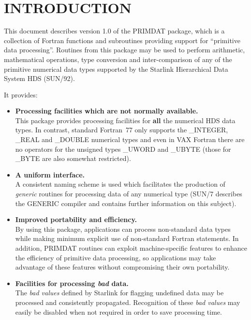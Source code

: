 \documentclass[11pt,nolof]{starlink}
\providecommand{\name}[1]{#1}
\begin{document}
\scfrontmatter

\section{INTRODUCTION}

This document describes version 1.0 of the \name{PRIMDAT} package, which
is a collection of Fortran functions and subroutines providing support for
``primitive data processing''.
Routines from this package may be used to perform arithmetic, mathematical
operations, type conversion and inter-comparison of any of the primitive
numerical data types supported by the Starlink Hierarchical Data System HDS
(SUN/92).

It provides:

\begin{itemize}

\item \textbf{Processing facilities which are not normally available.}\\
This package provides processing facilities for \textbf{all} the numerical
\name{HDS} data types.  In contrast, standard Fortran~77 only supports the
\name{\_INTEGER}, \name{\_REAL} and \name{\_DOUBLE} numerical types  and
even in \name{VAX} Fortran there are no operators for the unsigned types
\name{\_UWORD} and \name{\_UBYTE} (those for \name{\_BYTE} are also
somewhat restricted).

\item \textbf{A uniform interface.}\\
A consistent naming scheme is used which facilitates the production of \emph{generic} routines for processing data of any numerical type (\name{SUN/7}
describes the \name{GENERIC} compiler and contains further information on
this subject).

\item \textbf{Improved portability and efficiency.}\\
By using this package, applications can process non-standard data types
while making minimum explicit use of non-standard Fortran statements.
In addition, \name{PRIMDAT} routines can exploit machine-specific features
to enhance the efficiency of primitive data processing, so applications may
take advantage of these features without compromising their own portability.

\item \textbf{Facilities for processing \emph{bad} data.}\\
The \emph{bad values} defined by Starlink for flagging undefined data
may be processed and consistently propagated.
Recognition of these \emph{bad values} may easily be disabled when not
required in order to save processing time.


\end{itemize}
\end{document}
